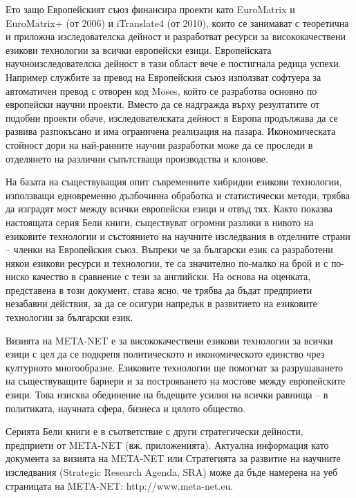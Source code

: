 \begin{multicols}{2}
Ето защо Европейският съюз финансира проекти като EuroMatrix и EuroMatrix+ (от 2006) и iTranslate4 (от 2010), които се занимават с теоретична и приложна изследователска дейност и разработват ресурси за висококачествени езикови технологии за всички европейски езици. Европейската научноизследователска дейност в тази област вече е постигнала редица успехи. Например службите за превод на Европейския съюз използват софтуера за автоматичен превод с отворен код Moses, който се разработва основно по европейски научни проекти. Вместо да се надгражда върху резултатите от подобни проекти обаче, изследователската дейност в Европа продължава да се развива разпокъсано и има ограничена реализация на пазара. Икономическата стойност дори на най-ранните научни разработки може да се проследи в отделянето на различни съпътстващи производства и клонове. 


На базата на съществуващия опит съвременните хибридни езикови технологии, използващи едновременно дълбочинна обработка и статистически методи, трябва да изградят мост между всички европейски езици и отвъд тях. Както показва настоящата серия Бели книги, съществуват огромни разлики в нивото на езиковите технологии и състоянието на научните изследвания в отделните страни -- членки на Европейския съюз.
Въпреки че за български език са разработени някои езикови ресурси и технологии, те са значително по-малко на брой и с по-ниско качество в сравнение с тези за английски.
На основа на оценката, представена в този документ, става ясно, че трябва да бъдат предприети незабавни действия, за да се осигури напредък в развитието на езиковите технологии за български език.

Визията на META-NET е за висококачествени езикови технологии за всички езици с цел да се подкрепя политическото и икономическото единство чрез културното многообразие. Езиковите технологии ще помогнат за разрушаването на съществуващите бариери и за построяването на мостове между европейските езици. Това изисква обединение на бъдещите усилия на всички равнища – в политиката, научната сфера, бизнеса и цялото общество.

Серията Бели книги е в съответствие с други стратегически дейности, предприети от META-NET (вж. приложенията). Актуална информация като документа за визията на META-NET \cite{Meta1} или Стратегията за развитие на научните изследвания (Strategic Research Agenda, SRA) може да бъде намерена на уеб страницата на META-NET: http://www.meta-net.eu.
  \end{multicols}

